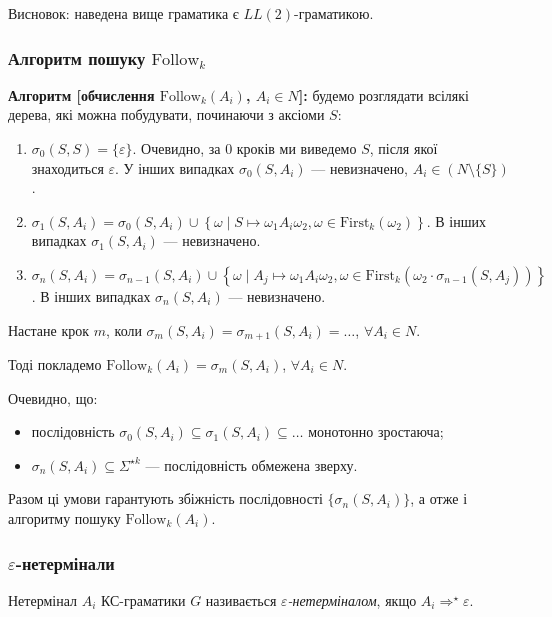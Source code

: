 Висновок: наведена вище граматика є $LL(2)$-граматикою.

\subsubsection{Алгоритм пошуку $\text{Follow}_k$}

\textbf{Алгоритм [обчислення $\text{Follow}_k (A_i)$, $A_i \in N$]:} будемо розглядати всілякі дерева, які можна побудувати, починаючи з аксіоми $S$:
\begin{enumerate}
	\item $\sigma_0(S, S) = \{\varepsilon\}$. Очевидно, за 0 кроків ми виведемо $S$, після якої знаходиться $\varepsilon$. У інших випадках $\sigma_0(S, A_i)$ --- невизначено, $A_i \in (N \setminus \{S\})$.
	\item $\sigma_1(S, A_i) = \sigma_0(S, A_i) \cup \left\{ \omega \mid S \mapsto \omega_1 A_i \omega_2, \omega \in \text{First}_k(\omega_2) \right\}$. В інших випадках $\sigma_1(S, A_i)$ --- невизначено.
	\item $\sigma_n(S, A_i) = \sigma_{n - 1}(S, A_i) \cup \left\{ \omega \mid A_j \mapsto \omega_1 A_i \omega_2, \omega \in \text{First}_k(\omega_2 \cdot \sigma_{n - 1}(S, A_j)) \right\}$. В інших випадках $\sigma_n(S, A_i)$ --- невизначено.
\end{enumerate}

Настане крок $m$, коли $\sigma_m(S, A_i) = \sigma_{m + 1}(S, A_i) = \ldots $, $\forall A_i \in N$. \medskip

Тоді покладемо $\text{Follow}_k(A_i) = \sigma_m(S, A_i)$, $\forall A_i \in N$. \medskip

Очевидно, що:
\begin{itemize}
	\item послідовність $\sigma_0(S, A_i) \subseteq \sigma_1(S, A_i) \subseteq \ldots$ монотонно зростаюча;
	\item $\sigma_n(S, A_i) \subseteq \Sigma^{\star k}$ --- послідовність обмежена зверху.
\end{itemize}

Разом ці умови гарантують збіжність послідовності $\{\sigma_n(S, A_i)\}$, а отже і алгоритму пошуку $\text{Follow}_k(A_i)$.

\subsubsection{$\varepsilon$-нетермінали}

Нетермінал $A_i$ КС-граматики $G$ називається \textit{$\varepsilon$-нетерміналом}, якщо $A_i \Rightarrow^\star \varepsilon$. \medskip


